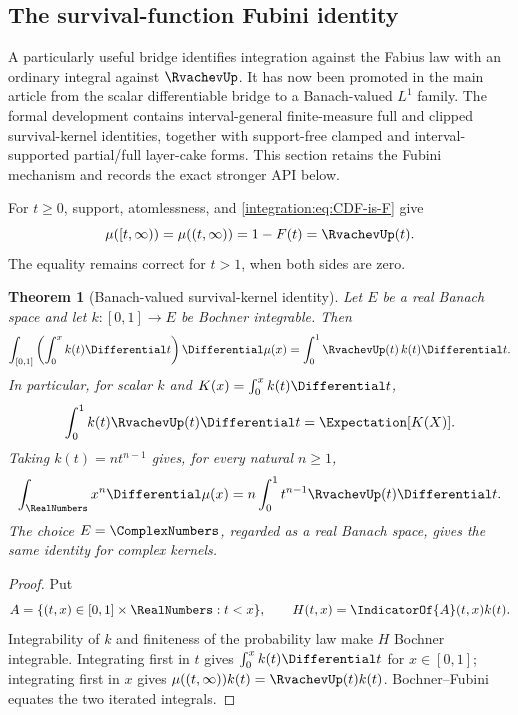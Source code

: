 \documentclass[11pt,oneside]{article}
\newtheorem{theorem}{Theorem}[section]
\theoremstyle{definition}
\theoremstyle{remark}
\begin{document}
\subsection{The survival-function Fubini identity}
\label{integration:sec:survival-fubini}

A particularly useful bridge identifies integration against the Fabius law
with an ordinary integral against $\RvachevUp$.  It has now been promoted in the
main article from the scalar differentiable bridge to a Banach-valued
\(L^1\) family.  The formal development contains interval-general
finite-measure full and clipped survival-kernel identities, together with
support-free clamped and interval-supported partial/full layer-cake forms.
This section retains the Fubini mechanism and records the exact stronger API
below.

For $t\ge0$, support, atomlessness, and
\eqref{integration:eq:CDF-is-F} give
\begin{equation}
 \mu([t,\infty))=\mu((t,\infty))=1-F(t)=\RvachevUp(t).
 \label{integration:eq:survival-is-up}
\end{equation}
The equality remains correct for $t>1$, when both sides are zero.

\begin{theorem}[Banach-valued survival-kernel identity]
\label{integration:thm:survival-kernel-Banach}
Let $E$ be a real Banach space and let $k:[0,1]\to E$ be Bochner integrable.
Then
\begin{equation}
 \int_{[0,1]}\left(\int_0^x k(t)\Differential t\right)\Differential\mu(x)
 =\int_0^1 \RvachevUp(t)\,k(t)\Differential t.
 \label{integration:eq:survival-kernel-Banach}
\end{equation}
In particular, for scalar $k$ and
$K(x)=\int_0^xk(t)\Differential t$,
\[
 \int_0^1k(t)\RvachevUp(t)\Differential t=\Expectation[K(X)].
\]
Taking \(k(t)=nt^{n-1}\) gives, for every natural \(n\geq1\),
\[
 \int_{\RealNumbers}x^n\Differential\mu(x)
 =n\int_0^1t^{n-1}\RvachevUp(t)\Differential t.
\]
The choice $E=\ComplexNumbers$, regarded as a real Banach space, gives the same identity
for complex kernels.
\end{theorem}

\begin{proof}
Put
\[
 A=\{(t,x)\in[0,1]\times\RealNumbers:t<x\},
 \qquad
 H(t,x)=\IndicatorOf{A}(t,x)k(t).
\]
Integrability of $k$ and finiteness of the probability law make $H$
Bochner integrable.  Integrating first in $t$ gives
$\int_0^xk(t)\Differential t$ for $x\in[0,1]$; integrating first in $x$ gives
$\mu((t,\infty))k(t)=\RvachevUp(t)k(t)$.  Bochner--Fubini equates the two
iterated integrals.
\end{proof}
\end{document}

